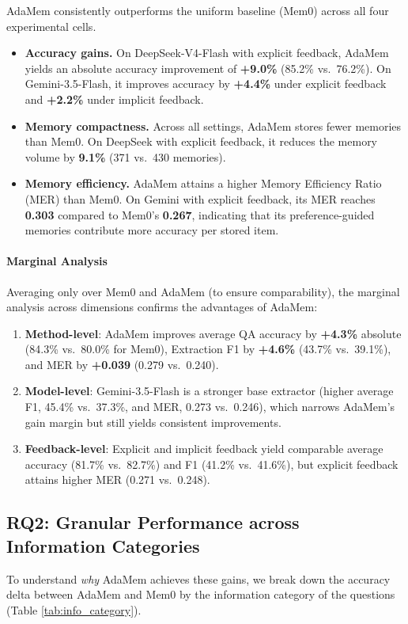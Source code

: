 \documentclass[11pt]{article}
\begin{document}
AdaMem consistently outperforms the uniform baseline (Mem0) across all four experimental cells.
\begin{itemize}
    \item \textbf{Accuracy gains.} On DeepSeek-V4-Flash with explicit feedback, AdaMem yields an absolute accuracy improvement of \textbf{+9.0\%} (85.2\% vs.\ 76.2\%). On Gemini-3.5-Flash, it improves accuracy by \textbf{+4.4\%} under explicit feedback and \textbf{+2.2\%} under implicit feedback.
    \item \textbf{Memory compactness.} Across all settings, AdaMem stores fewer memories than Mem0. On DeepSeek with explicit feedback, it reduces the memory volume by \textbf{9.1\%} (371 vs.\ 430 memories).
    \item \textbf{Memory efficiency.} AdaMem attains a higher Memory Efficiency Ratio (MER) than Mem0. On Gemini with explicit feedback, its MER reaches \textbf{0.303} compared to Mem0's \textbf{0.267}, indicating that its preference-guided memories contribute more accuracy per stored item.
\end{itemize}

\paragraph{Marginal Analysis}
Averaging only over Mem0 and AdaMem (to ensure comparability), the marginal analysis across dimensions confirms the advantages of AdaMem:
\begin{enumerate}
    \item \textbf{Method-level}: AdaMem improves average QA accuracy by \textbf{+4.3\%} absolute (84.3\% vs.\ 80.0\% for Mem0), Extraction F1 by \textbf{+4.6\%} (43.7\% vs.\ 39.1\%), and MER by \textbf{+0.039} (0.279 vs.\ 0.240).
    \item \textbf{Model-level}: Gemini-3.5-Flash is a stronger base extractor (higher average F1, 45.4\% vs.\ 37.3\%, and MER, 0.273 vs.\ 0.246), which narrows AdaMem's gain margin but still yields consistent improvements.
    \item \textbf{Feedback-level}: Explicit and implicit feedback yield comparable average accuracy (81.7\% vs.\ 82.7\%) and F1 (41.2\% vs.\ 41.6\%), but explicit feedback attains higher MER (0.271 vs.\ 0.248).
\end{enumerate}

\subsection{RQ2: Granular Performance across Information Categories}
To understand \emph{why} AdaMem achieves these gains, we break down the accuracy delta between AdaMem and Mem0 by the information category of the questions (Table \ref{tab:info_category}).
\end{document}
